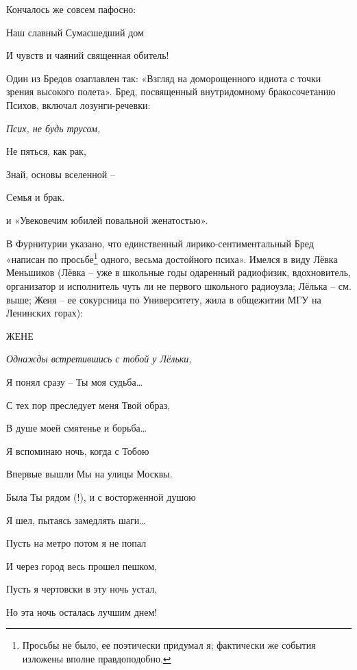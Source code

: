 \indent

\noindent
Кончалось же совсем пафосно:



{\itshape

    \indent
    
	Наш славный Сумасшедший дом
	
	И чувств и чаяний священная обитель!
}
\indent

Один из Бредов озаглавлен так: «Взгляд на доморощенного идиота с точки зрения высокого полета». Бред, посвященный внутридомному бракосочетанию Психов, включал лозунги-речевки:


\indent

{\itshape
    Псих, не будь трусом,
    
	Не пяться, как рак,
	
	Знай, основы вселенной – 
	
	Семья и брак.
}

\indent 

\noindent
и «Увековечим юбилей повальной женатостью».


В Фурнитурии указано, что единственный лирико-сентиментальный Бред «написан по просьбе\footnote{Просьбы не было, ее поэтически придумал я; фактически же события изложены вполне правдоподобно.}  одного, весьма достойного психа». Имелся в виду Лёвка Меньшиков (Лёвка – уже в школьные годы одаренный радиофизик, вдохновитель, организатор и исполнитель чуть ли не первого школьного радиоузла; Лёлька – см. выше; Женя – ее сокурсница по Университету, жила в общежитии МГУ на Ленинских горах):

\indent

\begin{center}
ЖЕНЕ
\end{center}

{\itshape
Однажды встретившись с тобой у Лёльки,

Я понял сразу – Ты моя судьба…

С тех пор преследует меня Твой образ,

В душе моей смятенье и борьба…

\indent

Я вспоминаю ночь, когда с Тобою

Впервые вышли Мы на улицы Москвы.

Была Ты рядом (!), и с восторженной душою

Я шел, пытаясь замедлять шаги…

\indent

Пусть на метро потом я не попал

И через город весь прошел пешком,

Пусть я чертовски в эту ночь устал,

Но эта ночь осталась лучшим днем!

\indent

}


